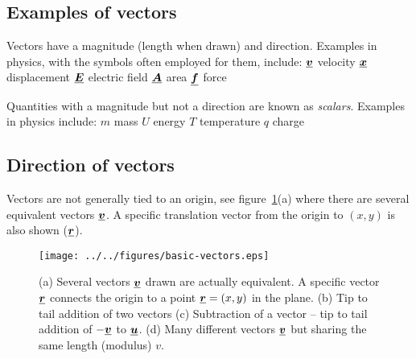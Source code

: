 



\addtolength{\topmargin}{-0.7 cm}
\setlength{\columnsep}{22pt}

\subsection*{Examples of vectors}
Vectors have a magnitude (length when drawn) and direction.  Examples in physics, with the symbols often employed for them, include:\nl
$\mathit{\underline{\boldsymbol{v}}}$ velocity \nl
$\mathit{\underline{\boldsymbol{x}}}$ displacement \nl
$\mathit{\underline{\boldsymbol{E}}}$ electric field \nl
$\mathit{\underline{\boldsymbol{A}}}$ area \nl
$\mathit{\underline{\boldsymbol{f}}}$ force \nl

\noindent Quantities with a magnitude but not a direction are known as \emph{scalars}.  Examples in physics include: \nl
$m$ mass \nl
$U$ energy \nl
$T$ temperature \nl
$q$ charge \nl

\subsection*{Direction of vectors}
Vectors are not generally tied to an origin, see
figure~\ref{fig:basic-vectors}(a) where there are several equivalent vectors $\mathit{\underline{\boldsymbol{v}}}$. A specific translation vector from the origin to $(x,y)$ is also shown ($\mathit{\underline{\boldsymbol{r}}}$).
\begin{figure}[h!]
\centering
\texttt{[image: ../../figures/basic-vectors.eps]}
\caption{(a) Several vectors $\mathit{\underline{\boldsymbol{v}}}$ drawn are actually equivalent.  A specific vector $\mathit{\underline{\boldsymbol{r}}}$ connects the origin to a point $\mathit{\underline{\boldsymbol{r}}} = (x,y)$ in the plane.  (b) Tip to tail addition of two vectors (c) Subtraction of a vector -- tip to tail addition of $-\mathit{\underline{\boldsymbol{v}}}$ to $\mathit{\underline{\boldsymbol{u}}}$.  (d) Many different vectors $\mathit{\underline{\boldsymbol{v}}}$ but sharing the same length (modulus) $v$. }\label{fig:basic-vectors}
\end{figure}

